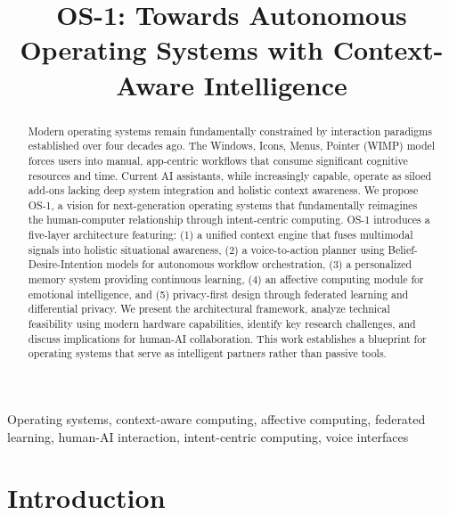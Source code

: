 \documentclass[conference]{IEEEtran}
\begin{document}
\title{OS-1: Towards Autonomous Operating Systems with Context-Aware Intelligence}

\author{
}

\maketitle

\begin{abstract}
Modern operating systems remain fundamentally constrained by interaction paradigms established over four decades ago. The Windows, Icons, Menus, Pointer (WIMP) model forces users into manual, app-centric workflows that consume significant cognitive resources and time. Current AI assistants, while increasingly capable, operate as siloed add-ons lacking deep system integration and holistic context awareness. We propose OS-1, a vision for next-generation operating systems that fundamentally reimagines the human-computer relationship through intent-centric computing. OS-1 introduces a five-layer architecture featuring: (1) a unified context engine that fuses multimodal signals into holistic situational awareness, (2) a voice-to-action planner using Belief-Desire-Intention models for autonomous workflow orchestration, (3) a personalized memory system providing continuous learning, (4) an affective computing module for emotional intelligence, and (5) privacy-first design through federated learning and differential privacy. We present the architectural framework, analyze technical feasibility using modern hardware capabilities, identify key research challenges, and discuss implications for human-AI collaboration. This work establishes a blueprint for operating systems that serve as intelligent partners rather than passive tools.
\end{abstract}

\begin{IEEEkeywords}
Operating systems, context-aware computing, affective computing, federated learning, human-AI interaction, intent-centric computing, voice interfaces
\end{IEEEkeywords}

\section{Introduction}
\end{document}
